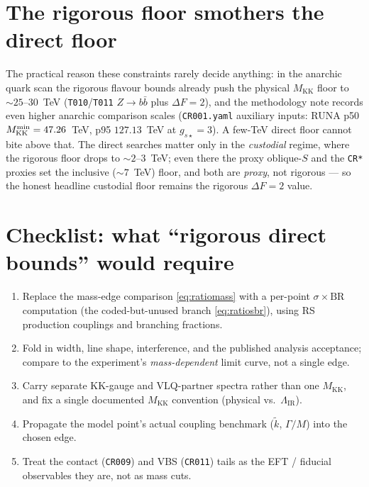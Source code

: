 \documentclass[11pt]{article}
\newcommand{\MKK}{M_{\mathrm{KK}}}
\newcommand{\LIR}{\Lambda_{\mathrm{IR}}}
\newcommand{\sBR}{\sigma\!\times\!\mathrm{BR}}
\newcommand{\code}[1]{\texttt{#1}}
\theoremstyle{definition}
\begin{document}
\section{The rigorous floor smothers the direct floor}
The practical reason these constraints rarely decide anything: in the anarchic
quark scan the rigorous flavour bounds already push the physical $\MKK$ floor to
$\sim 25$--$30$~TeV (\code{T010}/\code{T011} $Z\to b\bar b$ plus $\Delta F = 2$),
and the methodology note records even higher anarchic comparison scales
(\code{CR001.yaml} auxiliary inputs: RUNA p50 $\MKK^{\rm min} = 47.26$~TeV,
p95 $127.13$~TeV at $g_{s\star} = 3$). A few-TeV direct floor cannot bite above
that. The direct searches matter only in the \emph{custodial} regime, where the
rigorous floor drops to $\sim 2$--$3$~TeV; even there the proxy oblique-$S$ and
the \code{CR*} proxies set the inclusive ($\sim 7$~TeV) floor, and both are
\emph{proxy}, not rigorous --- so the honest headline custodial floor remains the
rigorous $\Delta F = 2$ value.

\section{Checklist: what ``rigorous direct bounds'' would require}
\begin{enumerate}[leftmargin=1.8em]
\item Replace the mass-edge comparison \eqref{eq:ratiomass} with a per-point
$\sBR$ computation (the coded-but-unused branch \eqref{eq:ratiosbr}), using RS
production couplings and branching fractions.
\item Fold in width, line shape, interference, and the published analysis
acceptance; compare to the experiment's \emph{mass-dependent} limit curve, not a
single edge.
\item Carry separate KK-gauge and VLQ-partner spectra rather than one $\MKK$, and
fix a single documented $\MKK$ convention (physical vs.\ $\LIR$).
\item Propagate the model point's actual coupling benchmark ($\tilde k$,
$\Gamma/M$) into the chosen edge.
\item Treat the contact (\code{CR009}) and VBS (\code{CR011}) tails as the EFT /
fiducial observables they are, not as mass cuts.
\end{enumerate}
\end{document}
